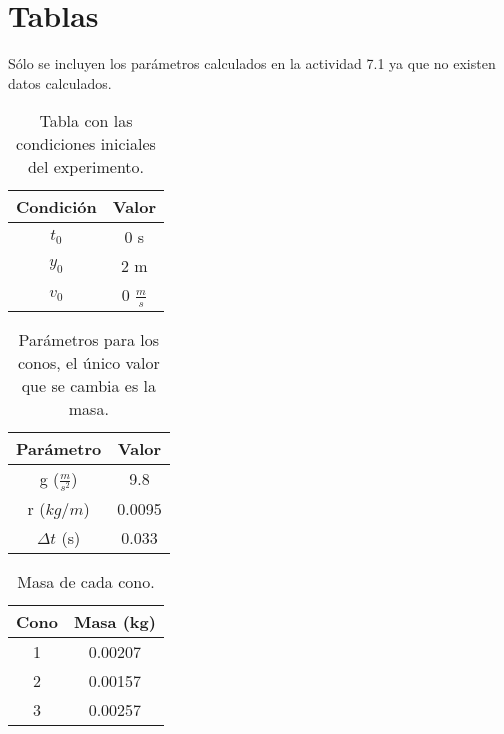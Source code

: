\section{Tablas}

Sólo se incluyen los parámetros calculados en la
actividad 7.1 ya que no existen datos calculados.

\begin{table}[h]
    \centering
    \begin{tabular}{|c|c|}
        \hline
        \rowcolor{azulito} Condición & Valor \\
        \hline $t_0$ & 0 s \\
        \hline $y_0$ & 2 m \\
        \hline $v_0$ & 0 $\frac ms$ \\
        \hline
    \end{tabular}
    \caption{Tabla con las condiciones iniciales
    del experimento.}
    \label{tab:CondIni}
\end{table}

\begin{table}[h]
    \centering
    \begin{tabular}{|c|c|}
        \hline
        \rowcolor{azulito} Parámetro & Valor \\
        \hline g ($\frac{m}{s^2}$) & 9.8 \\
        \hline r ($kg / m$) & 0.0095 \\
        \hline $\Delta t$ (s) & 0.033 \\
        \hline
    \end{tabular}
    \caption{Parámetros para los conos, el único valor
    que se cambia es la masa.}
    \label{tab:ParCono}
\end{table}

\begin{table}[h]
    \centering
    \begin{tabular}{|c|c|}
        \hline
        \rowcolor{azulito} Cono & Masa (kg) \\
        \hline 1    & 0.00207 \\
        \hline 2    & 0.00157 \\
        \hline 3    & 0.00257 \\
        \hline
    \end{tabular}
    \caption{Masa de cada cono.}
    \label{tab:MasaCono}
\end{table}
